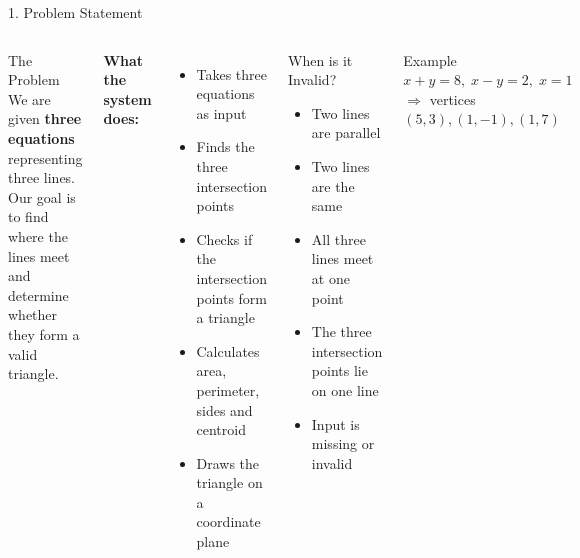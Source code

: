 \documentclass[aspectratio=169,11pt]{beamer}
\begin{document}
\begin{frame}{1. Problem Statement}

  \begin{columns}[T]


      \begin{block}{The Problem}
        We are given \textbf{three equations} representing three lines.
        Our goal is to find where the lines meet and determine whether
        they form a valid triangle.
      \end{block}

      \vspace{4pt}

      \textbf{What the system does:}

\begin{itemize}
    \item Takes three equations as input
    \item Finds the three intersection points
    \item Checks if the intersection points form a triangle
    \item Calculates area, perimeter, sides and centroid
    \item Draws the triangle on a coordinate plane
\end{itemize}


      \begin{alertblock}{When is it Invalid?}
        \begin{itemize}
          \item Two lines are parallel
          \item Two lines are the same
          \item All three lines meet at one point
          \item The three intersection points lie on one line
          \item Input is missing or invalid
        \end{itemize}
      \end{alertblock}

      \begin{exampleblock}{Example} $x+y=8,\; x-y=2,\; x=1$\\[2pt] $\Rightarrow$ vertices $(5,3),(1,-1),(1,7)$ \end{exampleblock}

  \end{columns}

\end{frame}
\end{document}
